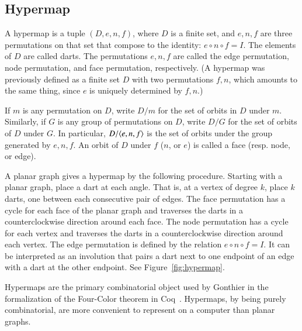\documentclass{article} %
\begin{document}
\subsection{Hypermap}

A hypermap is a tuple $(D,e,n,f)$, where $D$ is a finite
set, and $e,n,f$ are three permutations on that set that
compose to the identity:
$e\circ n\circ f = I$.  The elements of $D$ are called darts.
The permutations $e,n,f$ are called the edge permutation,
node permutation, and face permutation, respectively.
(A hypermap was previously defined as a finite set $D$ with
two permutations $f,n$, which amounts to the same thing,
since $e$ is uniquely determined by $f,n$.)

If $m$ is any permutation on $D$, write $D/m$ for the
set of orbits in $D$ under $m$.  Similarly, if $G$ is any
group of permutations on $D$, write $D/G$ for the set
of orbits of $D$ under $G$.  In particular, $D/\langle e,n,f\rangle$
is the set of orbits under the group generated by $e,n,f$.
An orbit of $D$ under $f$ ($n$, or $e$) is called a face (resp.
node, or edge).

A planar graph gives a hypermap
by the following procedure.  Starting with a planar graph,
place a dart at each angle.  That is, at a vertex of degree $k$,
place $k$ darts, one between each consecutive pair of edges.
The face permutation has a cycle for
each face of the planar graph and  traverses the
darts in a counterclockwise direction around each face.
The node permutation has a cycle for each vertex and traverses
the darts in a counterclockwise direction around each vertex.
The edge permutation is defined by the relation $e\circ n\circ f=I$.
It can be interpreted as an involution that pairs a dart next
to one endpoint of an edge with a dart at the other endpoint.
See Figure~\ref{fig:hypermap}.

\begin{floatingfigure}{80mm}
  \begin{center}
   \end{center}
  \caption{}
\label{fig:hypermap}
\end{floatingfigure}

Hypermaps are the primary combinatorial object used by Gonthier in the
formalization of the Four-Color theorem in
Coq~\cite{Gonthier:2005:FourColor}. Hypermaps, by being purely
combinatorial, are more convenient to represent on a computer than
planar graphs.
\end{document}
